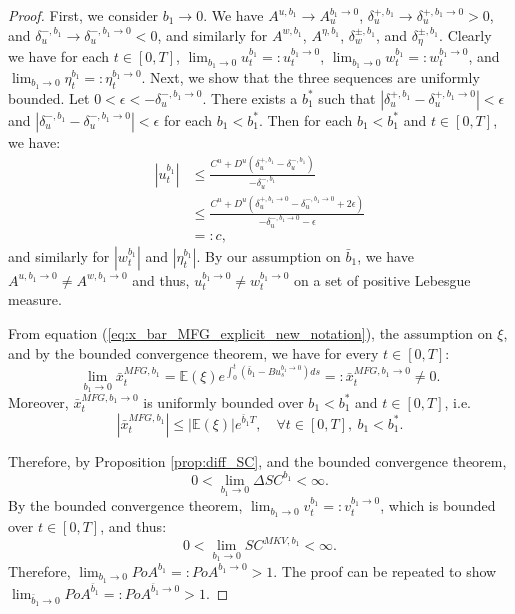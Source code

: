 \documentclass[11pt]{article}
\begin{document}
\begin{proof}
	First, we consider $b_1 \to 0$. We have $A^{u,b_1} \to A^{b_1\to 0}_u$, $\delta^{+,b_1}_u \to \delta^{+,b_1\to 0}_u>0$, and $\delta^{-,b_1}_u \to \delta^{-,b_1\to 0}_u<0$, and similarly for $A^{w,b_1}$, $A^{\eta,b_1}$, $\delta^{\pm,b_1}_w$, and $\delta^{\pm,b_1}_\eta$. Clearly we have for each $t\in[0,T]$, $\lim_{b_1 \to 0}u^{b_1}_t=:u^{b_1\to 0}_t$, $\lim_{b_1 \to 0}w^{b_1}_t=:w^{b_1 \to 0}_t$, and $\lim_{b_1 \to 0}\eta^{b_1}_t=:\eta^{b_1 \to 0}_t$. Next, we show that the three sequences are uniformly bounded. Let $0<\epsilon<-\delta^{-,b_1\to 0}_u$. There exists a $b_1^*$ such that $\left| \delta^{+,b_1}_u-\delta^{+,b_1\to0}_u \right|<\epsilon$ and $\left| \delta^{-,b_1}_u-\delta^{-,b_1\to0}_u \right|<\epsilon$ for each $b_1<b_1^*$. Then for each $b_1<b_1^*$ and $t\in[0,T]$, we have:
	\begin{equation*}
	\begin{split}
		\left|u^{b_1}_t\right| &\leq \frac{C^u+D^u\left(\delta^{+,b_1}_u-\delta^{-,b_1}_u\right) }{-\delta^{-,b_1}_u} \\
		&\leq \frac{C^u+D^u\left(\delta^{+,b_1\to 0}_u-\delta^{-,b_1 \to 0}_u+2\epsilon\right) }{-\delta^{-,b_1\to 0}_u-\epsilon}\\
		&=:c,
	\end{split}
	\end{equation*}
	and similarly for $\left|w^{b_1}_t\right|$ and $\left|\eta^{b_1}_t\right|$. By our assumption on $\bar{b}_1$, we have $A^{u,b_1\to 0} \neq A^{w,b_1\to 0}$ and thus, $u^{b_1\to 0}_t \neq w^{b_1\to 0}_t$ on a set of positive Lebesgue measure.
	
	From equation (\ref{eq:x_bar_MFG_explicit_new_notation}), the assumption on $\xi$, and by the bounded convergence theorem, we have for every $t \in [0,T]$:
	\begin{equation*}
	\lim_{b_1\to 0}\bar{x}_t^{MFG,b_1} = \mathbb{E}(\xi) e^{\int_0^t(\bar{b}_1-B u^{b_1\to 0}_s)ds} =: \bar{x}_t^{MFG,b_1\to 0}\neq 0.
	\end{equation*}
	Moreover, $\bar{x}_t^{MFG,b_1\to 0}$ is uniformly bounded over $b_1<b_1^*$ and $t \in [0,T]$, i.e. 
	$$ \left\vert \bar{x}^{MFG,b_1}_t \right\vert \leq \left\vert \mathbb{E}(\xi) \right\vert e^{ \bar{b}_1 T }, \quad \forall t \in [0,T],\ b_1<b_1^*. $$ 
	
	Therefore, by Proposition \ref{prop:diff_SC}, and the bounded convergence theorem,
    \begin{equation*}
        0<\lim_{b_1 \to 0} \Delta SC^{b_1}<\infty.
    \end{equation*}
    By the bounded convergence theorem, $\lim_{b_1 \to 0}v^{b_1}_t=:v_t^{b_1 \to 0}$, which is bounded over $t\in [0,T]$, and thus:
    $$0<\lim_{b_1 \to 0} SC^{MKV,b_1}<\infty.$$
    Therefore, $\lim_{b_1 \to 0} PoA^{b_1} =: PoA^{b_1 \to 0} > 1$. The proof can be repeated to show $\lim_{\bar{b}_1 \to 0} PoA^{\bar{b}_1} =: PoA^{\bar{b}_1 \to 0} > 1$.
    

\end{proof}
\end{document}
